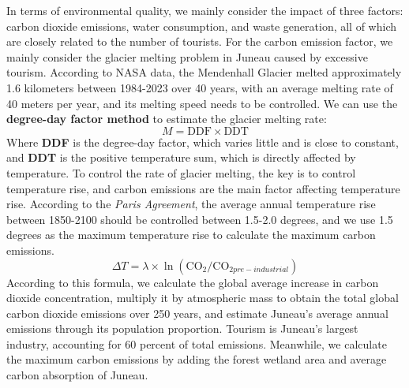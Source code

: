 \documentclass[12pt]{article}  %
\begin{document}
In terms of environmental quality, we mainly consider the impact of three factors: carbon dioxide emissions, water consumption, and waste generation, all of which are closely related to the number of tourists.
For the carbon emission factor, we mainly consider the glacier melting problem in Juneau caused by excessive tourism. According to NASA data,\cite{6} the Mendenhall Glacier melted approximately 1.6 kilometers between 1984-2023 over 40 years, with an average melting rate of 40 meters per year, and its melting speed needs to be controlled. We can use the \textbf{degree-day factor method} to estimate the glacier melting rate:
\begin{equation}
    M=\text{DDF}\times \text{DDT}
\end{equation}
Where \textbf{DDF} is the degree-day factor, which varies little and is close to constant, and \textbf{DDT} is the positive temperature sum, which is directly affected by temperature. To control the rate of glacier melting, the key is to control temperature rise, and carbon emissions are the main factor affecting temperature rise. According to the \textit{Paris Agreement}, the average annual temperature rise between 1850-2100 should be controlled between 1.5-2.0 degrees, and we use 1.5 degrees as the maximum temperature rise to calculate the maximum carbon emissions.
\begin{equation}
    \Delta T=\lambda\times \ln(\text{CO}_{2}/\text{CO}_{2pre-industrial})
\end{equation}
According to this formula, we calculate the global average increase in carbon dioxide concentration, multiply it by atmospheric mass to obtain the total global carbon dioxide emissions over 250 years, and estimate Juneau's average annual emissions through its population proportion. Tourism is Juneau's largest industry, accounting for 60 percent of total emissions. Meanwhile, we calculate the maximum carbon emissions by adding the forest wetland area and average carbon absorption of Juneau.
\end{document}
